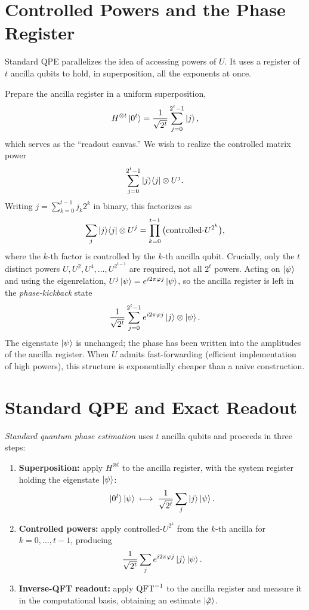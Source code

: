 \section{Controlled Powers and the Phase Register}

Standard QPE parallelizes the idea of accessing powers of $U$. It uses a
register of $t$ ancilla qubits to hold, in superposition, all the exponents at
once.

Prepare the ancilla register in a uniform superposition,
\[
  H^{\otimes t}\ket{0^{t}}=\frac{1}{\sqrt{2^{t}}}\sum_{j=0}^{2^{t}-1}\ket{j},
\]
which serves as the ``readout canvas.'' We wish to realize the controlled
matrix power
\[
  \sum_{j=0}^{2^{t}-1}\ket{j}\!\bra{j}\otimes U^{j}.
\]
Writing $j=\sum_{k=0}^{t-1}j_{k}2^{k}$ in binary, this factorizes as
\[
  \sum_{j}\ket{j}\!\bra{j}\otimes U^{j}
  =\prod_{k=0}^{t-1}\big(\text{controlled-}U^{2^{k}}\big),
\]
where the $k$-th factor is controlled by the $k$-th ancilla qubit. Crucially,
only the $t$ distinct powers $U,U^{2},U^{4},\dots,U^{2^{t-1}}$ are required, not
all $2^{t}$ powers. Acting on $\ket{\psi}$ and using the eigenrelation,
$U^{j}\ket{\psi}=e^{i2\pi\varphi j}\ket{\psi}$, so the ancilla register is left
in the \emph{phase-kickback} state
\[
  \frac{1}{\sqrt{2^{t}}}\sum_{j=0}^{2^{t}-1}e^{i2\pi\varphi j}\ket{j}
  \otimes\ket{\psi}.
\]
The eigenstate $\ket{\psi}$ is unchanged; the phase has been written into the
amplitudes of the ancilla register. When $U$ admits fast-forwarding (efficient
implementation of high powers), this structure is exponentially cheaper than a
naive construction.

\section{Standard QPE and Exact Readout}

\begin{definition}
\emph{Standard quantum phase estimation} uses $t$ ancilla qubits and proceeds in
three steps:
\begin{enumerate}
  \item \textbf{Superposition:} apply $H^{\otimes t}$ to the ancilla register,
        with the system register holding the eigenstate $\ket{\psi}$:
        \[
          \ket{0^{t}}\ket{\psi}\;\longmapsto\;
          \frac{1}{\sqrt{2^{t}}}\sum_{j}\ket{j}\ket{\psi}.
        \]
  \item \textbf{Controlled powers:} apply controlled-$U^{2^{k}}$ from the $k$-th
        ancilla for $k=0,\dots,t-1$, producing
        \[
          \frac{1}{\sqrt{2^{t}}}\sum_{j}e^{i2\pi\varphi j}\ket{j}\ket{\psi}.
        \]
  \item \textbf{Inverse-QFT readout:} apply $\mathrm{QFT}^{-1}$ to the ancilla register
        and measure it in the computational basis, obtaining an estimate
        $\ket{\tilde\varphi}$.
\end{enumerate}
\end{definition}

